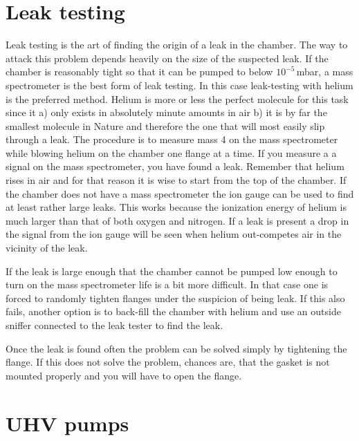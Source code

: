 \documentclass[a4paper,english]{article}
\begin{document}
\section{Leak testing}
Leak testing is the art of finding the origin of a leak in the chamber. The way to attack this problem depends heavily on the size of the suspected leak. If the chamber is reasonably tight so that it can be pumped to below $10^{-5}$\,mbar, a mass spectrometer is the best form of leak testing. In this case leak-testing with helium is the preferred method. Helium is more or less the perfect molecule for this task since it a) only exists in absolutely minute amounts in air b) it is by far the smallest molecule in Nature and therefore the one that will most easily slip through a leak. The procedure is to measure mass 4 on the mass spectrometer while blowing helium on the chamber one flange at a time. If you measure a a signal on the mass spectrometer, you have found a leak. Remember that helium rises in air and for that reason it is wise to start from the top of the chamber. If the chamber does not have a mass spectrometer the ion gauge can be used to find at least rather large leaks. This works because the ionization energy of helium is much larger than that of both oxygen and nitrogen. If a leak is present a drop in the signal from the ion gauge will be seen when helium out-competes air in the vicinity of the leak.

If the leak is large enough that the chamber cannot be pumped low enough to turn on the mass spectrometer life is a bit more difficult. In that case one is forced to randomly tighten flanges under the suspicion of being leak. If this also fails, another option is to back-fill the chamber with helium and use an outside sniffer connected to the leak tester to find the leak.

Once the leak is found often the problem can be solved simply by tightening the flange. If this does not solve the problem, chances are, that the gasket is not mounted properly and you will have to open the flange.  

\section{UHV pumps}
\end{document}
